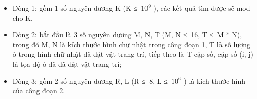 \begin{itemize}
	\item     Dòng 1: gồm 1 số nguyên dương K (K ≤ $10^{9}$    ), các kết quả tìm được sẽ mod cho K,   
	\item     Dòng 2: bắt đầu là 3 số nguyên dương M, N, T (M, N ≤ 16, T ≤ M * N), trong đó M, N là kích thước hình chữ nhật trong công đoạn 1, T là số lượng ô trong hình chữ nhật đã đặt vật trang trí, tiếp theo là T cặp số, cặp số (i, j) là tọa độ ô đã đã đặt vật trang trí;   
	\item     Dòng 3: gồm 2 số nguyên dương R, L (R ≤ 8, L ≤ $10^{6}$    ) là kích thước hình của công đoạn 2.   
\end{itemize}